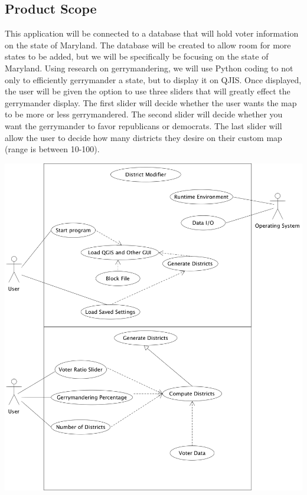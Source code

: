 \documentclass{article}
\begin{document}

\subsection{Product Scope}

\vspace{2.5mm}

\begin{addmargin}[4em]{0em}

This application will be connected to a database that will hold voter information on the state of Maryland. The database will be created to allow room for more states to be added, but we will be specifically be focusing on the state of Maryland. Using research on gerrymandering, we will use Python coding to not only to efficiently gerrymander a state, but to display it on QJIS. Once displayed, the user will be given the option to use three sliders that will greatly effect the gerrymander display. The first slider will decide whether the user wants the map to be more or less gerrymandered. The second slider will decide whether you want the gerrymander to favor republicans or democrats. The last slider will allow the user to decide how many districts they desire on their custom map (range is between 10-100).

\end{addmargin}

\begin{center}
\hspace*{-2cm}      
\includegraphics[scale=.15]{Program.png}
\end{center}
\end{document}
